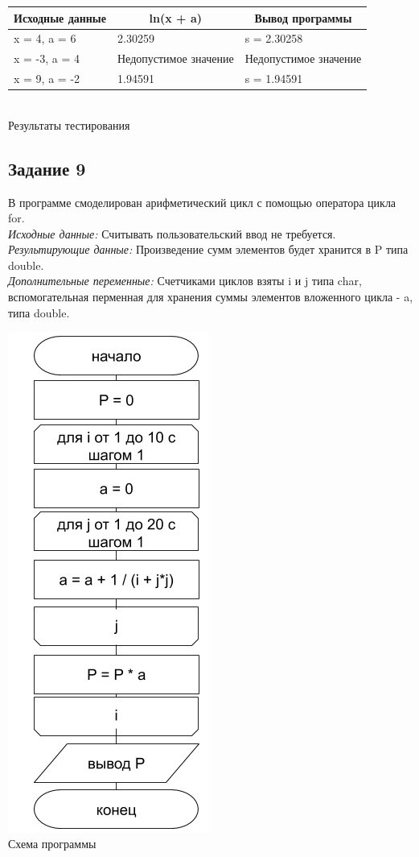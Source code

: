 \documentclass[a4paper,14pt]{extarticle}
\begin{document}
\begin{center}
\begin{tabular}{|l|l|l|}
\hline
\multicolumn{1}{|c|}{Исходные данные}&\multicolumn{1}{|c|}{ln(x + a)}& \multicolumn{1}{|c|}{Вывод программы}\\
\hline
x = 4, a = 6 & 2.30259 & s = 2.30258\\
x = -3, a = 4 & Недопустимое значение & Недопустимое значение\\
x = 9, a = -2 & 1.94591 & s = 1.94591\\
\hline
\end{tabular}\\
\vspace{0.3cm}
Результаты тестирования
\end{center}

\subsection{Задание 9}
В программе смоделирован арифметический цикл с помощью оператора цикла for.\\
\textit{Исходные данные:} Считывать пользовательский ввод не требуется.\\
\textit{Результирующие данные:} Произведение сумм элементов будет хранится в P типа double.\\
\textit{Дополнительные переменные:} Счетчиками циклов взяты i и j типа char, вспомогательная перменная для хранения суммы элементов вложенного цикла - a, типа double.\\
\begin{center}
\includegraphics[scale=0.6]{lab2-9.png}\\
Схема программы
\end{center}
\end{document}
